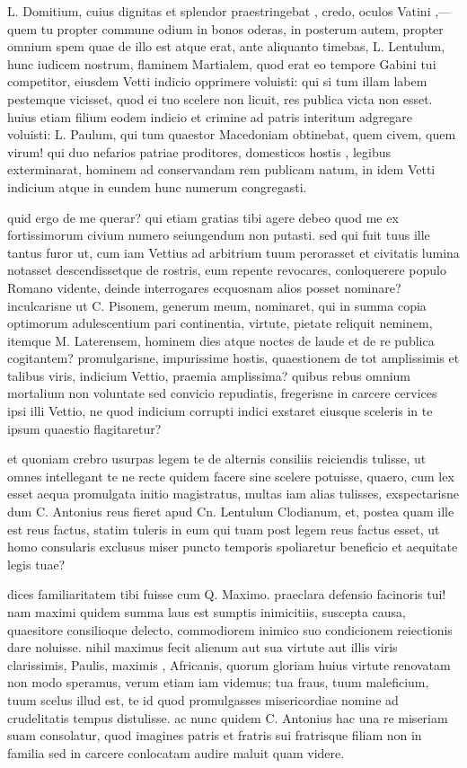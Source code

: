  L. Domitium, cuius dignitas et splendor praestringebat , credo, oculos Vatini ,—quem tu propter commune odium in bonos oderas, in posterum autem, propter omnium spem quae de illo est atque erat, ante aliquanto timebas, L. Lentulum, hunc iudicem nostrum, flaminem Martialem, quod erat eo tempore Gabini tui competitor, eiusdem Vetti indicio opprimere voluisti: qui si tum illam labem pestemque vicisset, quod ei tuo scelere non licuit, res publica victa non esset. huius etiam filium eodem indicio et crimine ad patris interitum adgregare voluisti: L. Paulum, qui tum quaestor Macedoniam obtinebat, quem civem, quem virum! qui duo nefarios patriae proditores, domesticos hostis , legibus exterminarat, hominem ad conservandam rem publicam natum, in idem Vetti indicium atque in eundem hunc numerum congregasti.

 quid ergo de me querar? qui etiam gratias tibi agere debeo quod me ex fortissimorum civium numero seiungendum non putasti. sed qui fuit tuus ille tantus furor ut, cum iam Vettius ad arbitrium tuum perorasset et civitatis lumina notasset descendissetque de rostris, eum repente revocares, conloquerere populo Romano vidente, deinde interrogares ecquosnam alios posset nominare? inculcarisne ut C. Pisonem, generum meum, nominaret, qui in summa copia optimorum adulescentium pari continentia, virtute, pietate reliquit neminem, itemque M. Laterensem, hominem dies atque noctes de laude et de re publica cogitantem? promulgarisne, impurissime hostis, quaestionem de tot amplissimis et talibus viris, indicium Vettio, praemia amplissima? quibus rebus omnium mortalium non voluntate sed convicio repudiatis, fregerisne in carcere cervices ipsi illi Vettio, ne quod indicium corrupti indici exstaret eiusque sceleris in te ipsum quaestio flagitaretur?

 et quoniam crebro usurpas legem te de alternis consiliis reiciendis tulisse, ut omnes intellegant te ne recte quidem facere sine scelere potuisse, quaero, cum lex esset aequa promulgata initio magistratus, multas iam alias tulisses, exspectarisne dum C. Antonius reus fieret apud Cn. Lentulum Clodianum, et, postea quam ille est reus factus, statim tuleris in eum qui tuam post legem reus factus esset, ut homo consularis exclusus miser puncto temporis spoliaretur beneficio et aequitate legis tuae?

 dices familiaritatem tibi fuisse cum Q. Maximo. praeclara defensio facinoris tui! nam maximi quidem summa laus est sumptis inimicitiis, suscepta causa, quaesitore consilioque delecto, commodiorem inimico suo condicionem reiectionis dare noluisse. nihil maximus fecit alienum aut sua virtute aut illis viris clarissimis, Paulis, maximis , Africanis, quorum gloriam huius virtute renovatam non modo speramus, verum etiam iam videmus; tua fraus, tuum maleficium, tuum scelus illud est, te id quod promulgasses misericordiae nomine ad crudelitatis tempus distulisse. ac nunc quidem C. Antonius hac una re miseriam suam consolatur, quod imagines patris et fratris sui fratrisque filiam non in familia sed in carcere conlocatam audire maluit quam videre.

